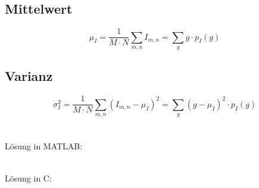 \subsection{Mittelwert}
\[
	\mu_I = \frac{1}{M \cdot N} \sum_{m,n}I_{m,n} = \sum_{g} g \cdot p_I(g)
\]

\subsection{Varianz}
\[
	\sigma^2_I = \frac{1}{M \cdot N} \sum_{m,n}\left( I_{m,n} - \mu_I \right)^2 = \sum_{g}(g - \mu_I)^2 \cdot p_I(g)
\]\\\\
Lösung in MATLAB:
\lstset{language=Matlab}

~\\
Lösung in C:
\lstset{language=C}

